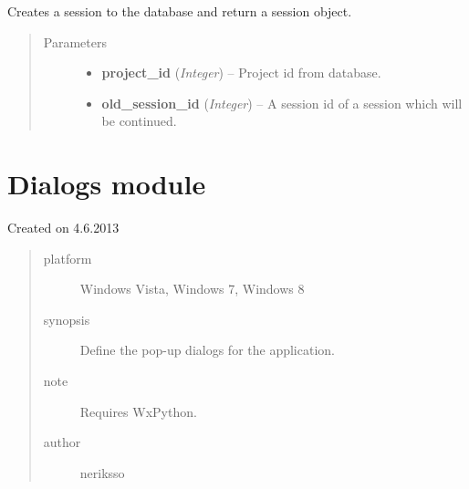 \documentclass[letterpaper,10pt,english]{sphinxmanual}
\begin{document}

\begin{fulllineitems}
\label{controller:controller.session.start_new_session}
Creates a session to the database and return a session object.
\begin{quote}\begin{description}
\item[{Parameters}] \leavevmode\begin{itemize}
\item {} 
\textbf{project\_id} (\emph{Integer}) -- Project id from database.

\item {} 
\textbf{old\_session\_id} (\emph{Integer}) -- A session id of a session which will be continued.

\end{itemize}

\end{description}\end{quote}

\end{fulllineitems}



\section{Dialogs module}
\label{dialogs:dialogs-module}\label{dialogs::doc}\label{dialogs:module-dialogs}
Created on 4.6.2013
\begin{quote}\begin{description}
\item[{platform}] \leavevmode
Windows Vista, Windows 7, Windows 8

\item[{synopsis}] \leavevmode
Define the pop-up dialogs for the application.

\item[{note}] \leavevmode
Requires WxPython.

\item[{author}] \leavevmode
neriksso

\end{description}\end{quote}
\end{document}

